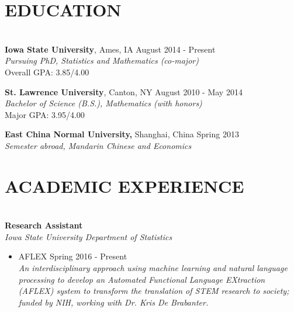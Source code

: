 \documentclass{res} %
\begin{document}
\address{
{\bf Department of Mathematics} \\
Iowa State University \\
244 Carver Hall \\
Ames, IA 50011 \\
}
\begin{resume}


\section{\textsc{EDUCATION}}

\hrulefill \\ %
{\bf Iowa State University}, Ames, IA \hfill August 2014 - Present \\
{\sl Pursuing PhD, Statistics and Mathematics (co-major)} \\
Overall GPA: 3.85/4.00

{\bf St. Lawrence University}, Canton, NY \hfill August 2010 - May 2014 \\
{\sl Bachelor of Science (B.S.), Mathematics (with honors)} \\
Major GPA: 3.95/4.00 

{\bf East China Normal University,} Shanghai, China \hfill Spring 2013 \\
{\sl Semester abroad, Mandarin Chinese and Economics} 





\section{ACADEMIC EXPERIENCE}

\hrulefill \\
{\bf Research Assistant} \\
{\sl Iowa State University Department of Statistics} 
\begin{itemize}
\item AFLEX \dotfill Spring 2016 - Present \\
\emph{An interdisciplinary approach using machine learning and natural language processing to develop an Automated Functional Language EXtraction (AFLEX) system to transform the translation of STEM research
to society; funded by NIH, working with Dr. Kris De Brabanter.}
\end{itemize}


\end{resume}
\end{document}
